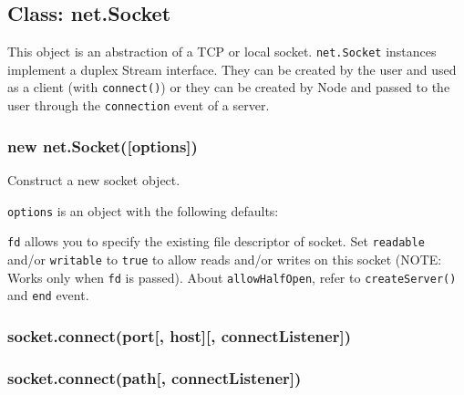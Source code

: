 \subsection{Class: net.Socket}\label{class-net.socket}

This object is an abstraction of a TCP or local socket.
\texttt{net.Socket} instances implement a duplex Stream interface. They
can be created by the user and used as a client (with
\texttt{connect()}) or they can be created by Node and passed to the
user through the \texttt{\textquotesingle{}connection\textquotesingle{}}
event of a server.

\subsubsection{new
net.Socket({[}options{]})}\label{new-net.socketoptions}

Construct a new socket object.

\texttt{options} is an object with the following defaults:

\begin{Shaded}
\begin{Highlighting}[]
\NormalTok{\{ }\NormalTok{: }
  \NormalTok{: }\NormalTok{,}
  \NormalTok{: }\NormalTok{,}
  \NormalTok{: }
\NormalTok{\}}
\end{Highlighting}
\end{Shaded}

\texttt{fd} allows you to specify the existing file descriptor of
socket. Set \texttt{readable} and/or \texttt{writable} to \texttt{true}
to allow reads and/or writes on this socket (NOTE: Works only when
\texttt{fd} is passed). About \texttt{allowHalfOpen}, refer to
\texttt{createServer()} and
\texttt{\textquotesingle{}end\textquotesingle{}} event.

\subsubsection{socket.connect(port{[}, host{]}{[},
connectListener{]})}\label{socket.connectport-host-connectlistener}

\subsubsection{socket.connect(path{[},
connectListener{]})}\label{socket.connectpath-connectlistener}

